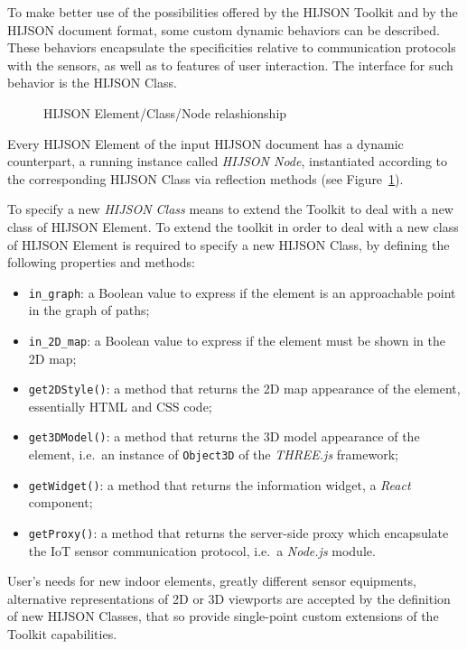 To make better use of the possibilities offered by the HIJSON Toolkit and by the
HIJSON document format, some custom dynamic behaviors can be described. These
behaviors encapsulate the specificities relative to communication
protocols with the sensors, as well as to features of user interaction. The
interface for such behavior is the HIJSON Class.

\begin{figure}[!h]
\centering
{}
\caption{HIJSON Element/Class/Node relashionship}
\label{fig:elem-class-node-rel}
\end{figure}

Every HIJSON Element of the input HIJSON document has a dynamic
counterpart, a running instance called \emph{HIJSON Node}, instantiated
according to the corresponding HIJSON Class via reflection methods (see
Figure~\ref{fig:elem-class-node-rel}).

To specify a new \emph{HIJSON Class} means to extend the Toolkit to deal with a
new class of HIJSON Element.
To extend the toolkit in order to deal with a new class of HIJSON Element is
required to specify a new HIJSON Class, by defining the following
properties and methods:

\begin{itemize}[noitemsep,topsep=0pt,parsep=0pt,partopsep=0pt,leftmargin=*]
\item
 \texttt{in\_graph}: a Boolean value to express if the element is an
 approachable point in the graph of paths;
\item
 \texttt{in\_2D\_map}: a Boolean value to express if the element must 
 be shown in the 2D map;
\item
 \texttt{get2DStyle()}: a method that returns the 2D map appearance of
 the element, essentially HTML and CSS code;
\item
 \texttt{get3DModel()}: a method that returns the 3D model appearance of
 the element, i.e.~an instance of \texttt{Obj\-ect\-3D} of the \emph{THREE.js} 
 framework;
\item
 \texttt{getWidget()}: a method that returns the information widget, a
 \emph{React} component;
\item
 \texttt{getProxy()}: a method that returns the server-side proxy which
 encapsulate the IoT sensor communication protocol, i.e.~a \emph{Node.js}
 module.
\end{itemize}

User's needs for new indoor elements, greatly different sensor equipments,
alternative representations of 2D or 3D viewports are accepted by the
definition of new HIJSON Classes, that so provide single-point
custom extensions of the Toolkit capabilities.
